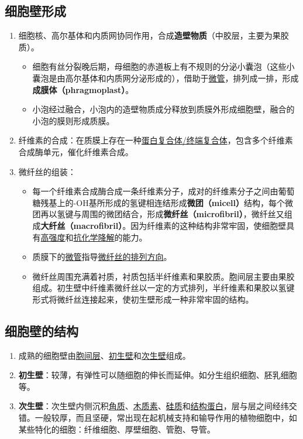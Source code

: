 \subsection{细胞壁形成}
\begin{enumerate}
    \item 细胞核、高尔基体和内质网协同作用，合成\textbf{造壁物质}（中胶层，主要为果胶质）。
    \begin{itemize}
        \item 细胞有丝分裂晚后期，母细胞的赤道板上有不规则的分泌小囊泡（这些小囊泡是由高尔基体和内质网分泌形成的），借助于\uline{微管}，排列成一排，形成\textbf{成膜体（phragmoplast）}。
        \item 小泡经过融合，小泡内的造壁物质成分释放到质膜外形成细胞壁，融合的小泡的膜则形成质膜。
    \end{itemize}
    \item 纤维素的合成：在质膜上存在一种\uline{蛋白复合体/终端复合体}，包含多个纤维素合成酶单元，催化纤维素合成。
    \item 微纤丝的组装：
    \begin{itemize}
        \item 每一个纤维素合成酶合成一条纤维素分子，成对的纤维素分子之间由葡萄糖残基上的-OH基所形成的氢键相连结形成\textbf{微团（micell）}结构，每个微团再以氢键与周围的微团结合，形成\textbf{微纤丝（microfibril）}，微纤丝又组成\textbf{大纤丝（macrofibril）}。因为纤维素的这种结构非常牢固，使细胞壁具有\uline{高强度}和\uline{抗化学降解}的能力。
        \item 质膜下的\uline{微管}指导\uline{微纤丝的排列方向}。
        \item 微纤丝周围充满着衬质，衬质包括半纤维素和果胶质。胞间层主要由果胶组成。初生壁中纤维素微纤丝以一定的方式排列，半纤维素和果胶以氢键形式将微纤丝连接起来，使初生壁形成一种非常牢固的结构。
    \end{itemize}
\end{enumerate}
\subsection{细胞壁的结构}
\begin{enumerate}
    \item 成熟的细胞壁由\uline{胞间层}、\uline{初生壁}和\uline{次生壁}组成。
    \item \textbf{初生壁}：较薄，有弹性可以随细胞的伸长而延伸。如分生组织细胞、胚乳细胞等。
    \item \textbf{次生壁}：次生壁内侧沉积\uline{角质}、\uline{木质素}、\uline{硅质}和\uline{结构蛋白}，层与层之间经纬交错。一般较厚，而且坚硬，常出现在起机械支持和输导作用的植物细胞中，如某些特化的细胞：纤维细胞、厚壁细胞、管胞、导管。
\end{enumerate}
